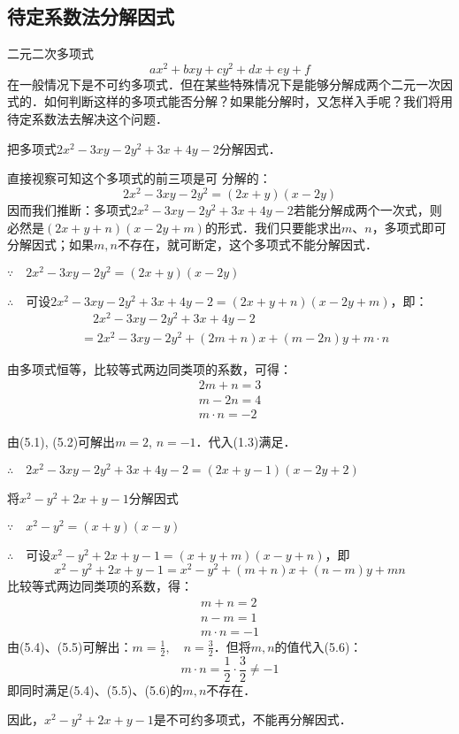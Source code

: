 \subsection{待定系数法分解因式}
二元二次多项式
\[ax^2+bxy+cy^2+dx+ey+f\]
在一般情况下是不可约多项式．但在某些特殊情况下是能够分解成两个二元一次因式的．如何判断这样的多项式能否分解？如果能分解时，又怎样入手呢？我们将用待定系数法去解决这个问题．



\begin{example}
    把多项式$2x^2-3xy-2y^2+3x+4y-2$分解因式．
\end{example}

\begin{analyze}
   直接视察可知这个多项式的前三项是可
    分解的：$$2x^2-3xy-2y^2=(2x+y)(x-2y)$$
 因而我们推断：多项式$2x^2-3xy-2y^2+3x+4y-2$若能分解成两个一次式，则必然是$(2x+y+n)(x-2y+m)$的形式．我们只要能求出$m$、$n$，多项式即可分解因式；如果$m, n$不存在，就可断定，这个多项式不能分解因式．   
\end{analyze}

\begin{solution}
$\because\quad 2x^2-3xy-2y^2=(2x+y)(x-2y)$

$\therefore\quad $可设$2x^2-3xy-2y^2+3x+4y-2=(2x+y+n)(x-2y+m)$，即：
\[\begin{split}
   &\quad 2x^2-3xy-2y^2+3x+4y-2\\
   &=2x^2-3xy-2y^2+(2m+n)x+(m-2n)y+m\cdot n 
\end{split}\]

由多项式恒等，比较等式两边同类项的系数，可得：
\begin{align}
        2m+n=3\\
        m-2n=4\\
        m\cdot n=-2
\end{align}

由(5.1), (5.2)可解出$m=2$, $n=-1$．代入(1.3)满足．

$\therefore\quad 2x^2-3xy-2y^2+3x+4y-2=(2x+y-1) (x-2y+2)$
\end{solution}


\begin{example}
    将$x^2-y^2+2x+y-1$分解因式
\end{example}


\begin{solution}
    $\because\quad x^2-y^2=(x+y)(x-y)$

$\therefore\quad $可设$x^2-y^2+2x+y-1=(x+y+m) (x-y+n)$，即
\[x^2-y^2+2x+y-1=x^2-y^2+ (m+n) x+ (n-m) y+mn\]
    比较等式两边同类项的系数，得：    
\begin{align}
    m+n=2\\
    n-m=1\\
    m\cdot n=-1
\end{align}
由(5.4)、(5.5)可解出：$m=\frac{1}{2},\quad n=\frac{3}{2}$．但将$m,n$的值代入(5.6)：
\[m\cdot n=\frac{1}{2}\cdot\frac{3}{2}\ne -1\]
即同时满足(5.4)、(5.5)、(5.6)的$m,n$不存在．

因此，$x^2-y^2+2x+y-1$是不可约多项式，不能再分解因式．
\end{solution}


